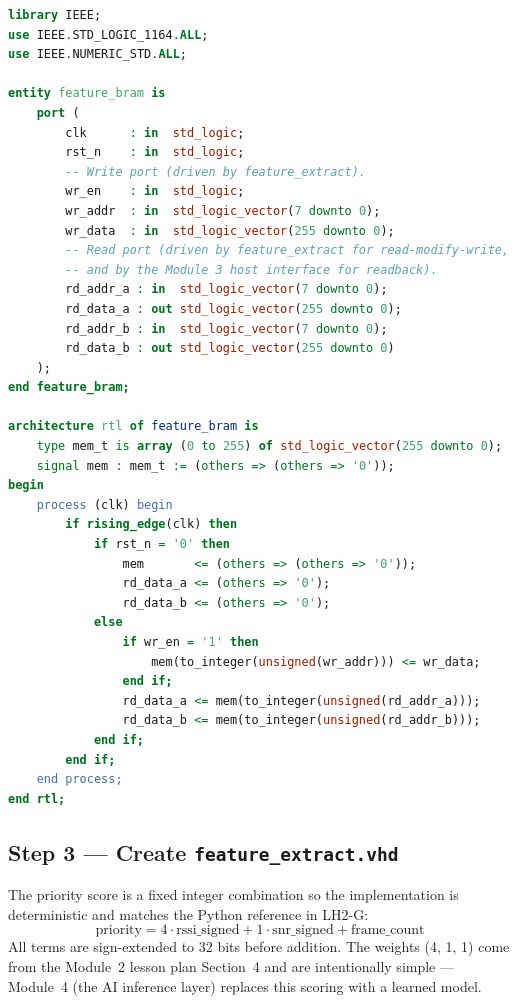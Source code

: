 \documentclass[11pt,letterpaper]{article}
\begin{document}
\begin{lstlisting}[language=VHDL, caption={\texttt{feature\_bram.vhd} --- 256-row $\times$ 256-bit dual-port \BRAM{}. Inferred as two 36-Kb tiles by Vivado. The synchronous reset on \texttt{mem} and the registered read outputs is required for clean Vivado xsim startup; without it, simulation reads of an as-yet-unwritten address can return stale signal values from the testbench harness rather than the 0-initialized memory contents.}]
library IEEE;
use IEEE.STD_LOGIC_1164.ALL;
use IEEE.NUMERIC_STD.ALL;

entity feature_bram is
    port (
        clk      : in  std_logic;
        rst_n    : in  std_logic;
        -- Write port (driven by feature_extract).
        wr_en    : in  std_logic;
        wr_addr  : in  std_logic_vector(7 downto 0);
        wr_data  : in  std_logic_vector(255 downto 0);
        -- Read port (driven by feature_extract for read-modify-write,
        -- and by the Module 3 host interface for readback).
        rd_addr_a : in  std_logic_vector(7 downto 0);
        rd_data_a : out std_logic_vector(255 downto 0);
        rd_addr_b : in  std_logic_vector(7 downto 0);
        rd_data_b : out std_logic_vector(255 downto 0)
    );
end feature_bram;

architecture rtl of feature_bram is
    type mem_t is array (0 to 255) of std_logic_vector(255 downto 0);
    signal mem : mem_t := (others => (others => '0'));
begin
    process (clk) begin
        if rising_edge(clk) then
            if rst_n = '0' then
                mem       <= (others => (others => '0'));
                rd_data_a <= (others => '0');
                rd_data_b <= (others => '0');
            else
                if wr_en = '1' then
                    mem(to_integer(unsigned(wr_addr))) <= wr_data;
                end if;
                rd_data_a <= mem(to_integer(unsigned(rd_addr_a)));
                rd_data_b <= mem(to_integer(unsigned(rd_addr_b)));
            end if;
        end if;
    end process;
end rtl;
\end{lstlisting}

\subsection{Step 3 --- Create \texttt{feature\_extract.vhd}}

The priority score is a fixed integer combination so the implementation is deterministic and matches the Python reference in LH2-G:
\[
\text{priority} = 4 \cdot \text{rssi\_signed} + 1 \cdot \text{snr\_signed} + \text{frame\_count}
\]
All terms are sign-extended to 32 bits before addition. The weights (4, 1, 1) come from the Module~2 lesson plan Section~4 and are intentionally simple --- Module~4 (the AI inference layer) replaces this scoring with a learned model.
\end{document}
